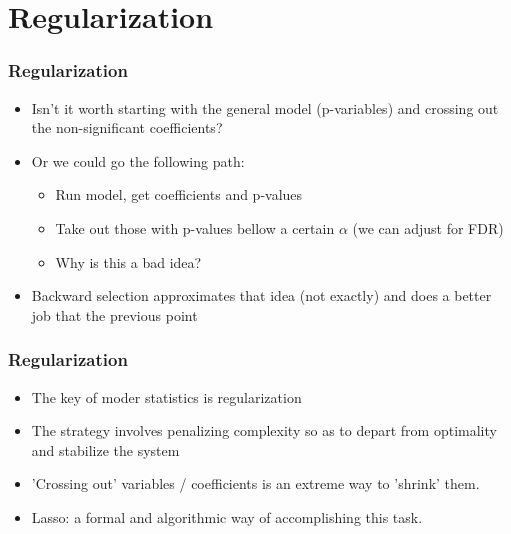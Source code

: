 \documentclass[
  shownotes,
  xcolor={svgnames},
  hyperref={colorlinks,citecolor=DarkBlue,linkcolor=DarkRed,urlcolor=DarkBlue}
  ]{beamer}
\begin{document}
\section{Regularization}
\begin{frame}[fragile]
\frametitle{Regularization}


\begin{itemize}
\item Isn't it worth starting with the general model (p-variables) and crossing out the non-significant coefficients?
\medskip
\item Or we could go the following path:
\begin{itemize}
    \item Run model, get coefficients and p-values
    \medskip
    \item Take out those with p-values bellow a certain $\alpha$ (we can adjust for FDR)
    \medskip
    \item Why is this a bad idea?
\end{itemize}
\medskip
\item Backward selection approximates that idea (not exactly) and does a better job that the previous point
\end{itemize}
\end{frame}
\begin{frame}[fragile]
\frametitle{Regularization}

\begin{itemize}
\item The key of moder statistics is regularization
\medskip
\item The strategy involves penalizing complexity so as to depart from optimality and stabilize the system
\medskip
\item 'Crossing out' variables / coefficients is an extreme way to 'shrink' them. 
\medskip
\item Lasso: a formal and algorithmic way of accomplishing this task. 



\end{itemize}
 

\end{frame}
\end{document}
